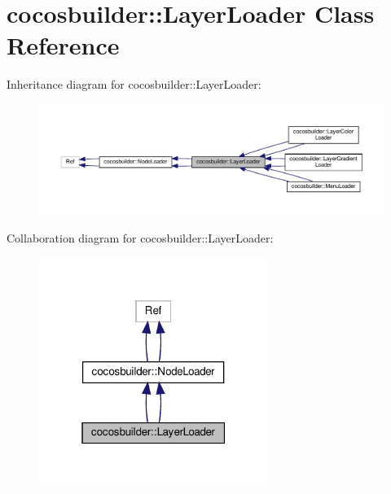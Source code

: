 \hypertarget{classcocosbuilder_1_1LayerLoader}{}\section{cocosbuilder\+:\+:Layer\+Loader Class Reference}
\label{classcocosbuilder_1_1LayerLoader}


Inheritance diagram for cocosbuilder\+:\+:Layer\+Loader\+:
\nopagebreak
\begin{figure}[H]
\begin{center}
\leavevmode
\includegraphics[width=350pt]{classcocosbuilder_1_1LayerLoader__inherit__graph}
\end{center}
\end{figure}


Collaboration diagram for cocosbuilder\+:\+:Layer\+Loader\+:
\nopagebreak
\begin{figure}[H]
\begin{center}
\leavevmode
\includegraphics[width=211pt]{classcocosbuilder_1_1LayerLoader__coll__graph}
\end{center}
\end{figure}
